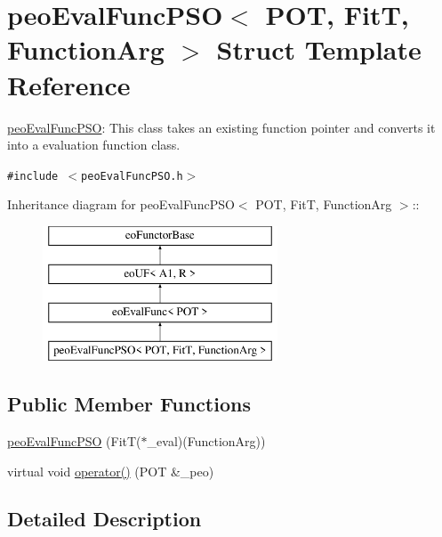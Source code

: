 \hypertarget{structpeoEvalFuncPSO}{
\section{peo\-Eval\-Func\-PSO$<$ POT, Fit\-T, Function\-Arg $>$ Struct Template Reference}
\label{structpeoEvalFuncPSO}
}
\hyperlink{structpeoEvalFuncPSO}{peo\-Eval\-Func\-PSO}: This class takes an existing function pointer and converts it into a evaluation function class.  


{\tt \#include $<$peo\-Eval\-Func\-PSO.h$>$}

Inheritance diagram for peo\-Eval\-Func\-PSO$<$ POT, Fit\-T, Function\-Arg $>$::\begin{figure}[H]
\begin{center}
\leavevmode
\includegraphics[height=4cm]{structpeoEvalFuncPSO}
\end{center}
\end{figure}
\subsection*{Public Member Functions}
\begin{CompactItemize}
\item 
\hypertarget{structpeoEvalFuncPSO_305954eae2e92a0679a57faf76ff7466}{
\hyperlink{structpeoEvalFuncPSO_305954eae2e92a0679a57faf76ff7466}{peo\-Eval\-Func\-PSO} (Fit\-T($\ast$\_\-eval)(Function\-Arg))}
\label{structpeoEvalFuncPSO_305954eae2e92a0679a57faf76ff7466}

\item 
\hypertarget{structpeoEvalFuncPSO_208e7cddb14436de991a5544d25250cb}{
virtual void \hyperlink{structpeoEvalFuncPSO_208e7cddb14436de991a5544d25250cb}{operator()} (POT \&\_\-peo)}
\label{structpeoEvalFuncPSO_208e7cddb14436de991a5544d25250cb}

\end{CompactItemize}


\subsection{Detailed Description}
